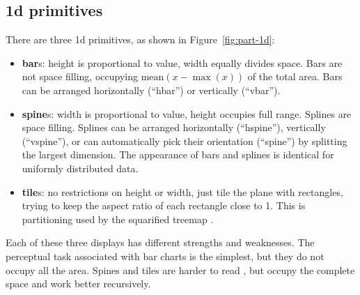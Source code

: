 \documentclass[journal]{vgtc}
\begin{document}
\subsection{1d primitives}
\label{sub:part-1d}

There are three 1d primitives, as shown in Figure~\ref{fig:part-1d}:

\begin{itemize}

  \item {\bf bar}s: height is proportional to value, width equally divides space. Bars are not space filling, occupying $\mbox{mean}(x - \max(x))$ of the total area. Bars can be arranged horizontally (``hbar'') or vertically (``vbar'').

  \item {\bf spine}s: width is proportional to value, height occupies full range. Splines are space filling. Splines can be arranged horizontally (``hspine''), vertically (``vspine''), or can automatically pick their orientation (``spine'') by splitting the largest dimension. The appearance of bars and splines is identical for uniformly distributed data.

  \item {\bf tile}s: no restrictions on height or width, just tile the plane with rectangles, trying to keep the aspect ratio of each rectangle close to 1. This is partitioning used by the squarified treemap \citep{bruls:1999}.

\end{itemize}

Each of these three displays has different strengths and weaknesses.  The perceptual task associated with bar charts is the simplest, but they do not occupy all the area. Spines and tiles are harder to read \citep{heer:2010}, but occupy the complete space and work better recursively.
\end{document}
